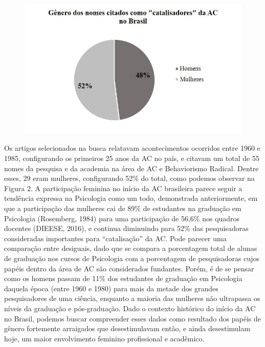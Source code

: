 \begin{figure}
\includegraphics[width=1\textwidth]{1/figura2}
\end{figure}

Os artigos selecionados na busca relatavam acontecimentos ocorridos entre 1960 e 1985, configurando os primeiros 25 anos da AC no país, e citavam um total de 55 nomes da pesquisa e da academia na área de AC e Behaviorismo Radical. Dentre esses, 29 eram mulheres, configurando 52\% do total, como podemos observar na Figura 2. A participação feminina no início da AC brasileira parece seguir a tendência expressa na Psicologia como um todo, demonstrada anteriormente, em que a participação das mulheres cai de 89\% de estudantes na graduação em Psicologia (Rosemberg, 1984) para uma participação de 56,6\% nos quadros docentes (DIEESE, 2016), e continua diminuindo para 52\% das pesquisadoras consideradas importantes para ``catalisação'' da AC. Pode parecer uma comparação entre desiguais, dado que se compara a porcentagem total de alunas de graduação nos cursos de Psicologia com a porcentagem de pesquisadoras cujos papéis dentro da área de AC são considerados fundantes. Porém, é de se pensar como os homens passam de 11\% dos estudantes de graduação em Psicologia daquela época (entre 1960 e 1980) para mais da metade dos grandes pesquisadores de uma ciência, enquanto a maioria das mulheres não ultrapassa os níveis da graduação e pós-graduação. Dado o contexto histórico do início da AC no Brasil, podemos buscar compreender esses dados como resultado dos papéis de gênero fortemente arraigados que desestimulavam então, e ainda desestimulam hoje, um maior envolvimento feminino profissional e acadêmico.

